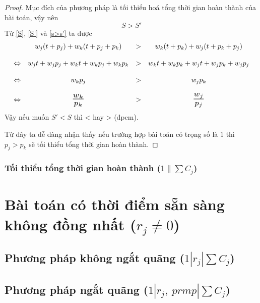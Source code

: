 \documentclass[12pt,a4paper]{report}
\begin{document}
\begin{proof}
	Mục đích của phương pháp là tối thiểu hoá tổng thời gian hoàn thành của bài toán, vậy nên
	\begin{equation} \label{s>s'}
		S > S'
	\end{equation}
	Từ \eqref{S}, \eqref{S'} và \eqref{s>s'} ta được
        \begin{equation*} \label{baitoannguyenhet}
        \begin{array}{c c c c}
		& w_j(t+p_j) + w_k(t+p_j+p_k) &>& w_k(t+p_k) + w_j(t+p_k+p_j) \\
		\\
		\Leftrightarrow & w_jt + w_jp_j + w_kt + w_k p_j + w_kp_k &>& w_k t + w_k p_k + w_j t + w_j p_k + w_j p_j \\
		\\
		\Leftrightarrow & w_k p_j &>& w_j p_k \\
		\\
		\Leftrightarrow & \scalebox{1.5}{$\frac{w_k}{p_k}$} &>& \scalebox{1.5}{$\frac{w_j}{p_j}$} \\
        \end{array}
        \end{equation*}
		Vậy nếu muốn $S'<S$ thì  <  hay  >  (đpcm).

		Từ đây ta dễ dàng nhận thấy nếu trường hợp bài toán có trọng số là $1$ thì $p_j>p_k$ sẽ tối thiểu tổng thời gian hoàn thành.
\end{proof}

\subsubsection*{Tối thiểu tổng thời gian hoàn thành ($1 \| \sum C_j$)}
\section{Bài toán có thời điểm sẵn sàng không đồng nhất ($r_j \neq 0$)}
\subsection{Phương pháp không ngắt quãng ($1 | r_j | \sum C_j$)}
\subsection{Phương pháp ngắt quãng ($1 | r_j, \: prmp | \sum C_j$)}
\end{document}
